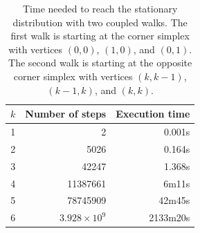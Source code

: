 \documentclass[a4paper,10pt]{article}
\begin{document}
\begin{table}[t!]
  \centering
  \caption{Time needed to reach the stationary distribution with two coupled walks. The first walk is starting at the corner simplex with vertices $(0,0)$, $(1,0)$, and $(0,1)$. The second walk is starting at the opposite corner simplex with vertices $(k,k-1)$, $(k-1,k)$, and $(k,k)$.}
  \label{Tab.Coupling}

  \bigskip

  \begin{tabular}{|c|r|r|}
    \hline
    $k$ & Number of steps & Execution time\\
    \hline
    1 & 2 & 0.001s \\
    2 & 5026 & 0.164s \\
    3 & 42247 & 1.368s \\
    4 & 11387661 & 6m11s \\
    5 & 78745909 & 42m45s \\
    6 & $3.928 \times 10^9$ & 2133m20s \\
    \hline
  \end{tabular}
\end{table}



\end{document}
